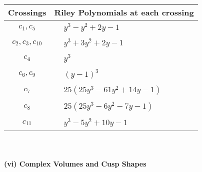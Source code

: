 \documentclass[1p]{elsarticle_modified}
\theoremstyle{definition}
\begin{document}
\begin{tabular}{m{50pt}|m{274pt}}
Crossings & \hspace{64pt}Riley Polynomials at each crossing \\
\hline $$\begin{aligned}c_{1},c_{5}\end{aligned}$$&$\begin{aligned}
&y^3- y^2+2 y-1
\end{aligned}$\\
\hline $$\begin{aligned}c_{2},c_{3},c_{10}\end{aligned}$$&$\begin{aligned}
&y^3+3 y^2+2 y-1
\end{aligned}$\\
\hline $$\begin{aligned}c_{4}\end{aligned}$$&$\begin{aligned}
&y^3
\end{aligned}$\\
\hline $$\begin{aligned}c_{6},c_{9}\end{aligned}$$&$\begin{aligned}
&(y-1)^3
\end{aligned}$\\
\hline $$\begin{aligned}c_{7}\end{aligned}$$&$\begin{aligned}
&25(25 y^3-61 y^2+14 y-1)
\end{aligned}$\\
\hline $$\begin{aligned}c_{8}\end{aligned}$$&$\begin{aligned}
&25(25 y^3-6 y^2-7 y-1)
\end{aligned}$\\
\hline $$\begin{aligned}c_{11}\end{aligned}$$&$\begin{aligned}
&y^3-5 y^2+10 y-1
\end{aligned}$\\
\hline
\end{tabular}\\~\\
\newpage\flushleft \textbf{(vi) Complex Volumes and Cusp Shapes}
\end{document}
